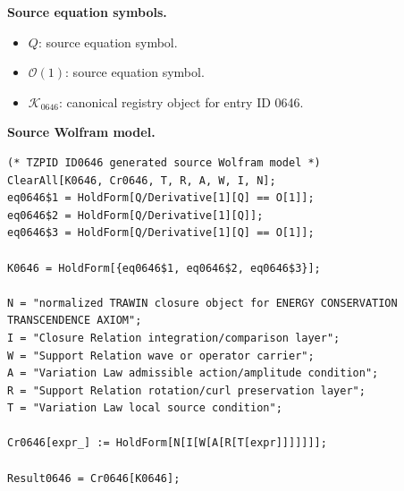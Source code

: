 \begin{minipage}[t]{0.49\linewidth}
\begingroup
\small
\raggedright
\textbf{Source equation symbols.}\par
\begin{itemize}[leftmargin=1.35em,itemsep=1pt,topsep=1pt,parsep=0pt]
    \item $Q$: source equation symbol.
    \item $\mathcal{O}(1)$: source equation symbol.
    \item $\mathcal{K}_{0646}$: canonical registry object for entry ID 0646.
\end{itemize}
\endgroup
\end{minipage}\hfill
\begin{minipage}[t]{0.47\linewidth}
\begingroup
\scriptsize
\raggedright
\textbf{Source Wolfram model.}\par
\begin{Verbatim}[fontsize=\tiny,breaklines=true,breakanywhere=true]
(* TZPID ID0646 generated source Wolfram model *)
ClearAll[K0646, Cr0646, T, R, A, W, I, N];
eq0646$1 = HoldForm[Q/Derivative[1][Q] == O[1]];
eq0646$2 = HoldForm[Q/Derivative[1][Q]];
eq0646$3 = HoldForm[Q/Derivative[1][Q] == O[1]];

K0646 = HoldForm[{eq0646$1, eq0646$2, eq0646$3}];

N = "normalized TRAWIN closure object for ENERGY CONSERVATION TRANSCENDENCE AXIOM";
I = "Closure Relation integration/comparison layer";
W = "Support Relation wave or operator carrier";
A = "Variation Law admissible action/amplitude condition";
R = "Support Relation rotation/curl preservation layer";
T = "Variation Law local source condition";

Cr0646[expr_] := HoldForm[N[I[W[A[R[T[expr]]]]]]];

Result0646 = Cr0646[K0646];
\end{Verbatim}
\endgroup
\end{minipage}

